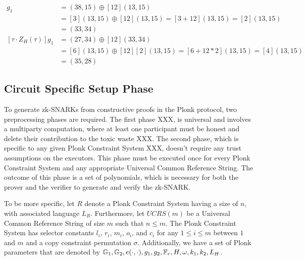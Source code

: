 \begin{example}
\begin{align*}
[Z_H(\tau)]g_1 & = (38,15) \oplus [12](13,15)\\
               & = [3](13,15) \oplus [12](13,15) = [3+12](13,15)= [2](13,15)\\
               & = (33,34)\\
[\tau\cdot Z_H(\tau)]g_1 & = (27,34) \oplus [12](33,34)\\
               & = [6](13,15) \oplus [12][2](13,15) = [6+12*2](13,15)= [4](13,15)\\
               & = (35,28)              
\end{align*}
\end{example}


\subsection{Circuit Specific Setup Phase}
To generate zk-SNARKs from constructive proofs in the Plonk protocol, two preprocessing phases are required. The first phase XXX, is universal and involves  a multiparty computation, where at least one participant must be honest and delete their contribution to the toxic waste XXX. The second phase, which is specific to any given Plonk Constraint System XXX, doesn't require any trust assumptions on the executors. This phase must be executed once for every Plonk Constraint System and any appropriate Universal Common Reference String. The outcome of this phase is a set of polynomials, which is necessary for both the prover and the verifier to generate and verify the zk-SNARK.

To be more specific, let $R$ denote a Plonk Constraint System having a size of $n$, with associated language $L_R$. Furthermore, let $UCRS(m)$ be a Universal Common Reference String of size $m$ such that $n\leq m$. The Plonk Constraint System has selector constants $l_i$, $r_i$, $m_i$, $o_i$, and $c_i$ for any $1\leq i \leq m$ between $1$ and $m$ and a copy constraint permutation $\sigma$. Additionally, we have a set of Plonk parameters that are denoted by ${\mathbb{G}_1, \mathbb{G}_2, e(\cdot,\cdot), g_1, g_2, \mathbb{F}_r, H, \omega, k_1, k_2, L_H}$.

